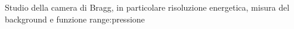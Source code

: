 Studio della camera di Bragg, in particolare risoluzione energetica, misura del background e funzione range:pressione
